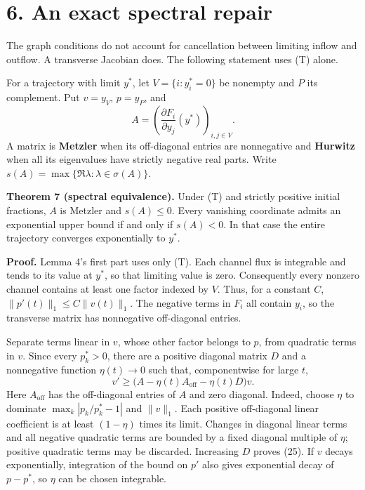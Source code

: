 \documentclass[
  11pt,
  a4paper,
]{scrartcl}
\newcounter{none} %
\begin{document}
\section{6. An exact spectral repair}\label{an-exact-spectral-repair}

The graph conditions do not account for cancellation between limiting
inflow and outflow. A transverse Jacobian does. The following statement
uses (T) alone.

For a trajectory with limit \(y^*\), let \(V=\{i:y_i^*=0\}\) be nonempty
and \(P\) its complement. Put \(v=y_V\), \(p=y_P\), and \[
A=\left(\frac{\partial F_i}{\partial y_j}(y^*)\right)_{i,j\in V}.
\tag{24}
\] A matrix is \textbf{Metzler} when its off-diagonal entries are
nonnegative and \textbf{Hurwitz} when all its eigenvalues have strictly
negative real parts. Write
\(s(A)=\max\{\Re\lambda:\lambda\in\sigma(A)\}\).

\textbf{Theorem 7 (spectral equivalence).} Under (T) and strictly
positive initial fractions, \(A\) is Metzler and \(s(A)\le0\). Every
vanishing coordinate admits an exponential upper bound if and only if
\(s(A)<0\). In that case the entire trajectory converges exponentially
to \(y^*\).

\textbf{Proof.} Lemma 4's first part uses only (T). Each channel flux is
integrable and tends to its value at \(y^*\), so that limiting value is
zero. Consequently every nonzero channel contains at least one factor
indexed by \(V\). Thus, for a constant \(C\),
\(\|p'(t)\|_1\le C\|v(t)\|_1\). The negative terms in \(F_i\) all
contain \(y_i\), so the transverse matrix has nonnegative off-diagonal
entries.

Separate terms linear in \(v\), whose other factor belongs to \(p\),
from quadratic terms in \(v\). Since every \(p_k^*>0\), there are a
positive diagonal matrix \(D\) and a nonnegative function
\(\eta(t)\to0\) such that, componentwise for large \(t\), \[
v'\ge\bigl(A-\eta(t)A_{\mathrm{off}}-\eta(t)D\bigr)v.
\tag{25}
\] Here \(A_{\mathrm{off}}\) has the off-diagonal entries of \(A\) and
zero diagonal. Indeed, choose \(\eta\) to dominate
\(\max_k|p_k/p_k^*-1|\) and \(\|v\|_1\). Each positive off-diagonal
linear coefficient is at least \((1-\eta)\) times its limit. Changes in
diagonal linear terms and all negative quadratic terms are bounded by a
fixed diagonal multiple of \(\eta\); positive quadratic terms may be
discarded. Increasing \(D\) proves (25). If \(v\) decays exponentially,
integration of the bound on \(p'\) also gives exponential decay of
\(p-p^*\), so \(\eta\) can be chosen integrable.
\end{document}
